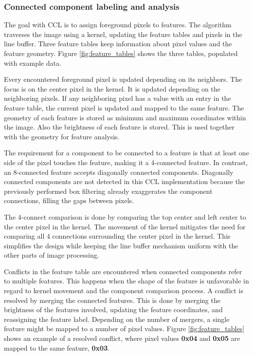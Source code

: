 \documentclass[12pt]{report}
\begin{document}
\subsubsection{Connected component labeling and analysis}
The goal with CCL is to assign foreground pixels to features. The algorithm traverses the image using a kernel, updating the feature tables and pixels in the line buffer. Three feature tables keep information about pixel values and the feature geometry. Figure \ref*{fig:feature_tables} shows the three tables, populated with example data.
\par
Every encountered foreground pixel is updated depending on its neighbors. The focus is on the center pixel in the kernel. It is updated depending on the neighboring pixels. If any neighboring pixel has a value with an entry in the feature table, the current pixel is updated and mapped to the same feature. The geometry of each feature is stored as minimum and maximum coordinates within the image. Also the brightness of each feature is stored. This is used together with the geometry for feature analysis. \citep{stpp}
\par
The requirement for a component to be connected to a feature is that at least one side of the pixel touches the feature, making it a 4-connected feature. In contrast, an 8-connected feature accepts diagonally connected components. Diagonally connected components are not detected in this CCL implementation because the previously performed box filtering already exaggerates the component connections, filling the gaps between pixels. \citep{stpp}
\par
The 4-connect comparison is done by comparing the top center and left center to the center pixel in the kernel. The movement of the kernel mitigates the need for comparing all 4 connections surrounding the center pixel in the kernel. This simplifies the design while keeping the line buffer mechanism uniform with the other parts of image processing. \citep{stpp}
\par
Conflicts in the feature table are encountered when connected components refer to multiple features. This happens when the shape of the feature is unfavorable in regard to kernel movement and the component comparison process. A conflict is resolved by merging the connected features. This is done by merging the brightness of the features involved, updating the feature coordinates, and reassigning the feature label. Depending on the number of mergers, a single feature might be mapped to a number of pixel values. Figure \ref*{fig:feature_tables} shows an example of a resolved conflict, where pixel values \textbf{0x04} and \textbf{0x05} are mapped to the same feature, \textbf{0x03}. \citep{stpp}
\end{document}
